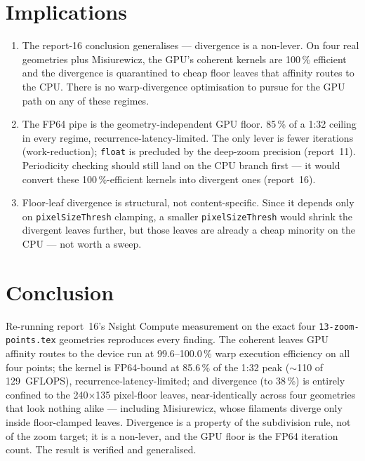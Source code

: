 \documentclass[
	english,
	letterpaper, oneside
]{article}
\begin{document}
\section{Implications}

\begin{enumerate}
  \item The report-16 conclusion generalises --- divergence is a
        non-lever. On four real geometries plus Misiurewicz, the GPU's coherent
        kernels are 100\,\% efficient and the divergence is quarantined to cheap
        floor leaves that affinity routes to the CPU. There is no warp-divergence
        optimisation to pursue for the GPU path on any of these regimes.
  \item The FP64 pipe is the geometry-independent GPU floor. 85\,\% of a
        1:32 ceiling in every regime, recurrence-latency-limited. The only lever
        is fewer iterations (work-reduction); \texttt{float} is precluded by the
        deep-zoom precision (report~11). Periodicity checking should still land on
        the CPU branch first --- it would convert these 100\,\%-efficient kernels
        into divergent ones (report~16).
  \item Floor-leaf divergence is structural, not content-specific. Since
        it depends only on \texttt{pixelSizeThresh} clamping, a smaller
        \texttt{pixelSizeThresh} would shrink the divergent leaves further, but
        those leaves are already a cheap minority on the CPU --- not worth a sweep.
\end{enumerate}

\section{Conclusion}

Re-running report~16's Nsight Compute measurement on the exact four
\texttt{13-zoom-points.tex} geometries reproduces every finding. The coherent
leaves GPU affinity routes to the device run at 99.6--100.0\,\% warp
execution efficiency on all four points; the kernel is FP64-bound at
85.6\,\% of the 1:32 peak ($\sim$110 of 129~GFLOPS), recurrence-latency-limited;
and divergence (to 38\,\%) is entirely confined to the
240$\times$135 pixel-floor leaves, near-identically across four geometries that
look nothing alike --- including Misiurewicz, whose filaments diverge only inside
floor-clamped leaves. Divergence is a property of the subdivision rule, not of the
zoom target; it is a non-lever, and the GPU floor is the FP64 iteration count.
The result is verified and generalised.
\end{document}
